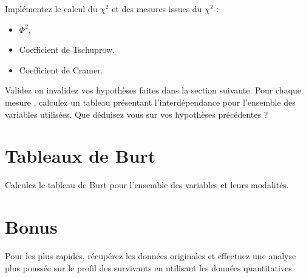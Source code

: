 \documentclass[11pt]{exam}
\begin{document}
\begin{questions}
  \question Implémentez le calcul du $\chi^2$ et des mesures issues du
  $ \chi^2$ :
  \begin{itemize}
  \item $\Phi^2$,
  \item Coefficient de Tschuprow,
  \item Coefficient de Cramer.
  \end{itemize}
  \question Validez on invalidez vos hypothèses faites dans la section suivante.
  \question Pour chaque mesure , calculez un tableau présentant
  l'interdépendance pour l'ensemble des variables utilisées.
  \question Que déduisez vous sur vos hypothèses précédentes ? 
\end{questions}

\section{Tableaux de Burt}
\begin{questions}
  \question Calculez le tableau de Burt pour l'ensemble des variables
  et leurs modalités.
\end{questions}
\section*{Bonus}
\begin{questions}
  \question Pour les plus rapides, récupérez les données originales et
  effectuez une analyse plus poussée sur le profil des survivants en
  utilisant les données quantitatives.

\end{questions}
 
\end{document}
